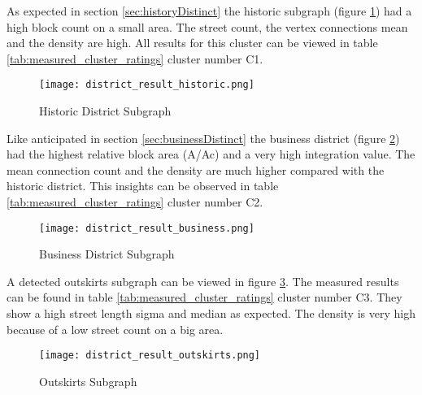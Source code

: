 As expected in section \ref{sec:historyDistinct} the historic subgraph (figure \ref{fig:result_historic_district}) had a high block count on a small area. The street count, the vertex connections mean and the density are high. All results for this cluster can be viewed in table \ref{tab:measured_cluster_ratings} cluster number C1.

\begin{figure}[ht]
    \centering
    \begin{mdframed}[style=mdthight, userdefinedwidth=0.4\textwidth, align=center]
        \texttt{[image: district\_result\_historic.png]}
    \end{mdframed}
    \caption{Historic District Subgraph}
    \label{fig:result_historic_district}
\end{figure}
\FloatBarrier

Like anticipated in section \ref{sec:businessDistinct} the business district (figure \ref{fig:result_business_district}) had the highest relative block area (A/Ac) and a very high integration value. The mean connection count and the density are much higher compared with the historic district. This insights can be observed in table \ref{tab:measured_cluster_ratings} cluster number C2.

\begin{figure}[ht]
    \centering
    \begin{mdframed}[style=mdthight, userdefinedwidth=0.4\textwidth, align=center]
        \texttt{[image: district\_result\_business.png]}
    \end{mdframed}
    \caption{Business District Subgraph}
    \label{fig:result_business_district}
\end{figure}
\FloatBarrier

A detected outskirts subgraph can be viewed in figure \ref{fig:result_outskirts_district}. The measured results can be found in table \ref{tab:measured_cluster_ratings} cluster number C3. They show a high street length sigma and median as expected. The density is very high because of a low street count on a big area.

\begin{figure}[ht]
    \centering
    \begin{mdframed}[style=mdthight, userdefinedwidth=0.6\textwidth, align=center]
        \texttt{[image: district\_result\_outskirts.png]}
    \end{mdframed}
    \caption{Outskirts Subgraph}
    \label{fig:result_outskirts_district}
\end{figure}
\FloatBarrier

